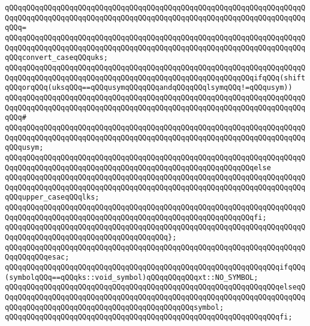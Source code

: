 \verb|qQQqqQQqqQQqqQQqqQQqqQQqqQQqqQQqqQQqqQQqqQQqqQQqqQQqqQQqqQQqqQQqqQQqqQQqqQQqqQQqqQQqqQQqqQQqqQQqqQQqqQQqqQQqqQQqqQQqqQQqqQQqqQQqqQQqqQQqqQQqqQQq=|\newline
\verb|qQQqqQQqqQQqqQQqqQQqqQQqqQQqqQQqqQQqqQQqqQQqqQQqqQQqqQQqqQQqqQQqqQQqqQQqqQQqqQQqqQQqqQQqqQQqqQQqqQQqqQQqqQQqqQQqqQQqqQQqqQQqqQQqqQQqqQQqqQQqqQQqconvert_caseqQQquks;|\newline
\newline
\verb|qQQqqQQqqQQqqQQqqQQqqQQqqQQqqQQqqQQqqQQqqQQqqQQqqQQqqQQqqQQqqQQqqQQqqQQqqQQqqQQqqQQqqQQqqQQqqQQqqQQqqQQqqQQqqQQqqQQqqQQqqQQqqQQqifqQQq(shiftqQQqorqQQq(uksqQQq==qQQqusymqQQqqQQqandqQQqqQQqlsymqQQq!=qQQqusym))|\newline
\verb|qQQqqQQqqQQqqQQqqQQqqQQqqQQqqQQqqQQqqQQqqQQqqQQqqQQqqQQqqQQqqQQqqQQqqQQqqQQqqQQqqQQqqQQqqQQqqQQqqQQqqQQqqQQqqQQqqQQqqQQqqQQqqQQqqQQqqQQqqQQqqQQq#|\newline
\verb|qQQqqQQqqQQqqQQqqQQqqQQqqQQqqQQqqQQqqQQqqQQqqQQqqQQqqQQqqQQqqQQqqQQqqQQqqQQqqQQqqQQqqQQqqQQqqQQqqQQqqQQqqQQqqQQqqQQqqQQqqQQqqQQqqQQqqQQqqQQqqQQqusym;|\newline
\verb|qQQqqQQqqQQqqQQqqQQqqQQqqQQqqQQqqQQqqQQqqQQqqQQqqQQqqQQqqQQqqQQqqQQqqQQqqQQqqQQqqQQqqQQqqQQqqQQqqQQqqQQqqQQqqQQqqQQqqQQqqQQqqQQqelse|\newline
\verb|qQQqqQQqqQQqqQQqqQQqqQQqqQQqqQQqqQQqqQQqqQQqqQQqqQQqqQQqqQQqqQQqqQQqqQQqqQQqqQQqqQQqqQQqqQQqqQQqqQQqqQQqqQQqqQQqqQQqqQQqqQQqqQQqqQQqqQQqqQQqqQQqupper_caseqQQqlks;|\newline
\verb|qQQqqQQqqQQqqQQqqQQqqQQqqQQqqQQqqQQqqQQqqQQqqQQqqQQqqQQqqQQqqQQqqQQqqQQqqQQqqQQqqQQqqQQqqQQqqQQqqQQqqQQqqQQqqQQqqQQqqQQqqQQqqQQqfi;|\newline
\verb|qQQqqQQqqQQqqQQqqQQqqQQqqQQqqQQqqQQqqQQqqQQqqQQqqQQqqQQqqQQqqQQqqQQqqQQqqQQqqQQqqQQqqQQqqQQqqQQqqQQqqQQqqQQq};|\newline
\verb|qQQqqQQqqQQqqQQqqQQqqQQqqQQqqQQqqQQqqQQqqQQqqQQqqQQqqQQqqQQqqQQqqQQqqQQqqQQqqQQqesac;|\newline
\newline
\verb|qQQqqQQqqQQqqQQqqQQqqQQqqQQqqQQqqQQqqQQqqQQqqQQqqQQqqQQqqQQqqQQqifqQQq(symbolqQQq==qQQqks::void_symbol)qQQqqQQqqQQqxt::NO_SYMBOL;|\newline
\verb|qQQqqQQqqQQqqQQqqQQqqQQqqQQqqQQqqQQqqQQqqQQqqQQqqQQqqQQqqQQqqQQqelseqQQqqQQqqQQqqQQqqQQqqQQqqQQqqQQqqQQqqQQqqQQqqQQqqQQqqQQqqQQqqQQqqQQqqQQqqQQqqQQqqQQqqQQqqQQqqQQqqQQqqQQqqQQqqQQqqQQqsymbol;|\newline
\verb|qQQqqQQqqQQqqQQqqQQqqQQqqQQqqQQqqQQqqQQqqQQqqQQqqQQqqQQqqQQqqQQqfi;|\newline
